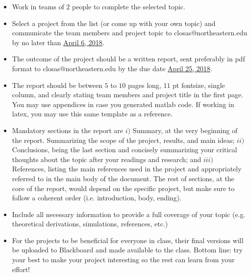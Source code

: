 \documentclass[11pt]{article}
\begin{document}
\begin{itemize}
	\item Work in teams of $2$ people to complete the selected topic. 
    \item Select a project from the list (or come up with your own topic) and communicate the team members and project topic to closas@northeastern.edu by no later than \underline{April 6, 2018}.
    \item The outcome of the project should be a written report, sent preferably in pdf format to closas@northeastern.edu by the due date \underline{April 25, 2018}. 
    \item The report should be between $5$ to $10$ pages long, $11$ pt fontsize, single column, and clearly stating team members and project title in the first page. You may use appendices in case you generated matlab code. If working in latex, you may use this same template as a reference.
    \item Mandatory sections in the report are $i)$ Summary, at the very beginning of the report. Summarizing the scope of the project, results, and main ideas; $ii)$ Conclusions, being the last section and concisely summarizing your critical thoughts about the topic after your readings and research; and $iii)$ References, listing the main references used in the project and appropriately referred to in the main body of the document. The rest of sections, at the core of the report, would depend on the specific project, but make sure to follow a coherent order (i.e. introduction, body, ending).   
    \item Include all necessary information to provide a full coverage of your topic (e.g. theoretical derivations, simulations, references, etc.) 
    \item For the projects to be beneficial for everyone in class, their final versions will be uploaded to Blackboard and made available to the class. Bottom line: try your best to make your project interesting so the rest can learn from your effort! 
\end{itemize}





\end{document}
